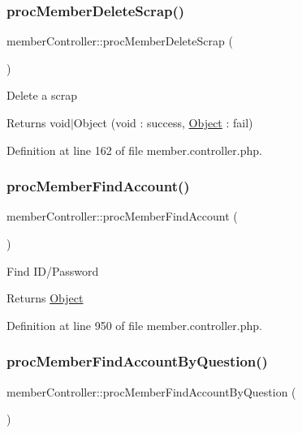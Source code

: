 \subsubsection{\texorpdfstring{proc\+Member\+Delete\+Scrap()}{procMemberDeleteScrap()}}
{\footnotesize\ttfamily member\+Controller\+::proc\+Member\+Delete\+Scrap (\begin{DoxyParamCaption}{ }\end{DoxyParamCaption})}

Delete a scrap

\begin{DoxyReturn}{Returns}
void$\vert$\+Object (void \+: success, \hyperlink{classObject}{Object} \+: fail) 
\end{DoxyReturn}


Definition at line 162 of file member.\+controller.\+php.

\hypertarget{classmemberController_a6ba64b98fa5d0fd55435e464f02d050e}{}\label{classmemberController_a6ba64b98fa5d0fd55435e464f02d050e} 
\subsubsection{\texorpdfstring{proc\+Member\+Find\+Account()}{procMemberFindAccount()}}
{\footnotesize\ttfamily member\+Controller\+::proc\+Member\+Find\+Account (\begin{DoxyParamCaption}{ }\end{DoxyParamCaption})}

Find I\+D/\+Password

\begin{DoxyReturn}{Returns}
\hyperlink{classObject}{Object} 
\end{DoxyReturn}


Definition at line 950 of file member.\+controller.\+php.

\hypertarget{classmemberController_a1141d3b40fc5927dcbaff3b4b4b11bff}{}\label{classmemberController_a1141d3b40fc5927dcbaff3b4b4b11bff} 
\subsubsection{\texorpdfstring{proc\+Member\+Find\+Account\+By\+Question()}{procMemberFindAccountByQuestion()}}
{\footnotesize\ttfamily member\+Controller\+::proc\+Member\+Find\+Account\+By\+Question (\begin{DoxyParamCaption}{ }\end{DoxyParamCaption})}

